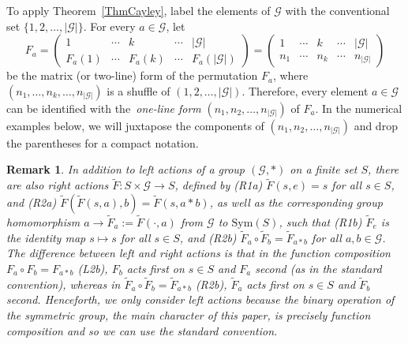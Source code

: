 \documentclass{article}
\newtheorem{remark}[theorem]{Remark}
\begin{document}
To apply Theorem~\ref{ThmCayley}, label the elements of $\mathcal{G}$ with
the conventional set $\{1,2,\ldots,\left\vert \mathcal{G}\right\vert \}$. For
every $a\in \mathcal{G}$, let%
\begin{equation}
F_{a}=\left( 
\begin{array}{ccccc}
1 & \cdots & k & \cdots & \left\vert \mathcal{G}\right\vert \\ 
F_{a}(1) & \cdots & F_{a}(k) & \cdots & F_{a}(\left\vert \mathcal{G}%
\right\vert )%
\end{array}%
\right) =\left( 
\begin{array}{ccccc}
1 & \cdots & k & \cdots & \left\vert \mathcal{G}\right\vert \\ 
n_{1} & \cdots & n_{k} & \cdots & n_{\left\vert \mathcal{G}\right\vert }%
\end{array}%
\right)  \label{2line form}
\end{equation}%
be the matrix (or two-line) form of the permutation $F_{a}$, where $%
(n_{1},\ldots,n_{k},\ldots,n_{\left\vert \mathcal{G}\right\vert })$ is a shuffle
of $(1,2,\ldots,\left\vert \mathcal{G}\right\vert )$. Therefore, every element $%
a\in \mathcal{G}$ can be identified with the\textit{\ one-line form} $%
(n_{1},n_{2},\ldots,n_{\left\vert \mathcal{G}\right\vert })$ of $F_{a}$. In the
numerical examples below, we will juxtapose the components of $%
(n_{1},n_{2},\ldots,n_{\left\vert \mathcal{G}\right\vert })$ and drop the
parentheses for a compact notation.

\begin{remark}
\label{REmarkRightLeft}In addition to left actions of a group $(\mathcal{G}%
,\ast )$ on a finite set $S$, there are also right actions $\tilde{F}%
:S\times \mathcal{G}\rightarrow S$, defined by (R1a) $\tilde{F}(s,e)=s$ for
all $s\in S$, and (R2a) $\tilde{F}(\tilde{F}(s,a),b)=\tilde{F}(s,a\ast b)$,
as well as the corresponding group homomorphism $a\rightarrow \tilde{F}_{a}:=%
\tilde{F}(\cdot ,a)$ from $\mathcal{G}$ to $\mathrm{Sym}(S)$, such that
(R1b) $\tilde{F}_{e}$ is the identity map $s\mapsto s$ for all $s\in S$, and
(R2b) $\tilde{F}_{a}\circ \tilde{F}_{b}=\tilde{F}_{a\ast b}$ for all $a,b\in 
\mathcal{G}$.   The difference between left and right actions is that in the
function composition $F_{a}\circ F_{b}=F_{a\ast b}$ (L2b), $F_{b}$ acts
first on $s\in S$ and $F_{a}$ second (as in the standard convention),
whereas in $\tilde{F}_{a}\circ \tilde{F}_{b}=\tilde{F}_{a\ast b}$ (R2b), $%
\tilde{F}_{a}$ acts first on $s\in S$ and $\tilde{F}_{b}$ second. Henceforth,
we only consider left actions because the binary operation of the symmetric
group, the main character of this paper, is precisely function composition
and so we can use the standard convention.
\end{remark}
\end{document}
